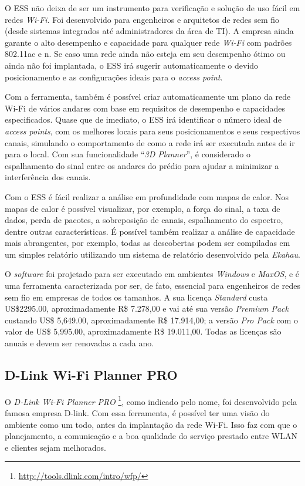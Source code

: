 \documentclass[
	12pt,				%
	twoside,			%
	a4paper,			%
	english,			%
	french,				%
	spanish,			%
	brazil				%
	]{abntex2}
\begin{document}
O ESS não deixa de ser um instrumento para verificação e solução de uso
fácil em redes \emph{Wi-Fi}. Foi desenvolvido para engenheiros e
arquitetos de redes sem fio (desde sistemas integrados até
administradores da área de TI). A empresa ainda garante o alto
desempenho e capacidade para qualquer rede \emph{Wi-Fi} com padrões
802.11ac e n. Se caso uma rede ainda não esteja em seu desempenho ótimo
ou ainda não foi implantada, o ESS irá sugerir automaticamente o devido
posicionamento e as configurações ideais para o \emph{access point}.

Com a ferramenta, também é possível criar automaticamente um plano da
rede Wi-Fi de vários andares com base em requisitos de desempenho e
capacidades especificados. Quase que de imediato, o ESS irá identificar
o número ideal de \emph{access points}, com os melhores locais para seus
posicionamentos e seus respectivos canais, simulando o comportamento de
como a rede irá ser executada antes de ir para o local. Com sua
funcionalidade ``\emph{3D Planner}'', é considerado o espalhamento do
sinal entre os andares do prédio para ajudar a minimizar a interferência
dos canais.

Com o ESS é fácil realizar a análise em profundidade com mapas de calor.
Nos mapas de calor é possível visualizar, por exemplo, a força do sinal,
a taxa de dados, perda de pacotes, a sobreposição de canais,
espalhamento do espectro, dentre outras características. É possível
também realizar a análise de capacidade mais abrangentes, por exemplo,
todas as descobertas podem ser compiladas em um simples relatório
utilizando um sistema de relatório desenvolvido pela \emph{Ekahau}.

O \emph{software} foi projetado para ser executado em ambientes
\emph{Windows} e \emph{MaxOS}, e é uma ferramenta caracterizada por ser,
de fato, essencial para engenheiros de redes sem fio em empresas de
todos os tamanhos. A sua licença \emph{Standard} custa US\$2295.00,
aproximadamente R\$ 7.278,00 e vai até sua versão \emph{Premium Pack}
custando US\$ 5,649.00, aproximadamente R\$ 17.914,00; a versão
\emph{Pro Pack} com o valor de US\$ 5,995.00, aproximadamente R\$
19.011,00. Todas as licenças são anuais e devem ser renovadas a cada
ano.

\subsection{D-Link Wi-Fi Planner PRO}\label{d-link-wi-fi-planner-pro}

O \emph{D-Link Wi-Fi Planner PRO} \footnote{\url{http://tools.dlink.com/intro/wfp/}},
como indicado pelo nome, foi desenvolvido pela famosa empresa D-link.
Com essa ferramenta, é possível ter uma visão do ambiente como um todo,
antes da implantação da rede Wi-Fi. Isso faz com que o planejamento, a
comunicação e a boa qualidade do serviço prestado entre WLAN e clientes
sejam melhorados.
\end{document}
